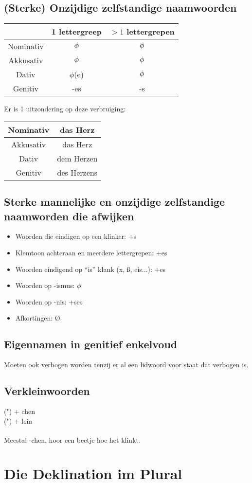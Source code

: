 \documentclass[main.tex]{subfiles}
\begin{document}
\subsection{(Sterke) Onzijdige zelfstandige naamwoorden}
\begin{minipage}[t]{0.5\textwidth}
\begin{tabular}{|c|c|c|}
\hline 
\rowcolor{gray}
& 1 lettergreep & $>1$ lettergrepen \\ 
\hline 
\cellcolor[gray]{0.8}Nominativ & $\phi$ & $\phi$\\ 
\hline 
\cellcolor[gray]{0.8}Akkusativ & $\phi$ & $\phi$\\ 
\hline 
\cellcolor[gray]{0.8}Dativ & $\phi$(e) & $\phi$ \\ 
\hline 
\cellcolor[gray]{0.8}Genitiv & -es & -s \\ 
\hline 
\end{tabular} 
\end{minipage}
\begin{minipage}{0.5\textwidth}
Er is 1 uitzondering op deze verbruiging:\\
\begin{tabular}{|c|c|}
\hline 
\cellcolor[gray]{0.8}Nominativ & das Herz \\ 
\hline 
\cellcolor[gray]{0.8}Akkusativ & das Herz \\ 
\hline 
\cellcolor[gray]{0.8}Dativ & dem Herzen \\ 
\hline 
\cellcolor[gray]{0.8}Genitiv & des Herzens \\ 
\hline 
\end{tabular}
\end{minipage}
\subsection{Sterke mannelijke en onzijdige zelfstandige naamworden die afwijken}
\begin{itemize}
\item Woorden die eindigen op een klinker: +s
\item Klemtoon achteraan en meerdere lettergrepen:	+es
\item Woorden eindigend op “is” klank (x, ß, eis...):	+es
\item Woorden op -ismus:					$\phi$
\item Woorden op -nis:				+ses
\item Afkortingen:						Ø
\end{itemize}

\subsection{Eigennamen in genitief enkelvoud}
Moeten ook verbogen worden tenzij er al een lidwoord voor staat dat verbogen is.
\subsection{Verkleinwoorden}
(") + chen\\
(") + lein\\
\\
Meestal -chen, hoor een beetje hoe het klinkt.
\section{Die Deklination im Plural}
\end{document}

